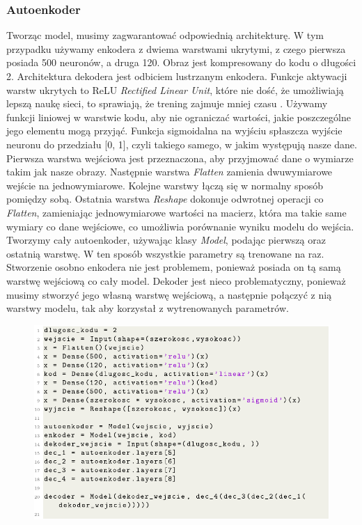 \documentclass[a4paper,12pt,oneside]{book} %
\begin{document}
\subsubsection{Autoenkoder}
Tworząc model, musimy zagwarantować odpowiednią architekturę. W tym przypadku używamy enkodera z dwiema warstwami ukrytymi, z czego pierwsza posiada 500 neuronów, a druga 120. Obraz jest kompresowany do kodu o długości 2. Architektura dekodera jest odbiciem lustrzanym enkodera. Funkcje aktywacji warstw ukrytych to ReLU \textit{Rectified Linear Unit}, które nie dość, że umożliwiają lepszą naukę sieci, to sprawiają, że trening zajmuje mniej czasu \cite{relu}. Używamy funkcji liniowej w warstwie kodu, aby nie ograniczać wartości, jakie poszczególne jego elementu mogą przyjąć. Funkcja sigmoidalna na wyjściu spłaszcza wyjście neuronu do przedziału [0, 1], czyli takiego samego, w jakim występują nasze dane.\\

Pierwsza warstwa wejściowa jest przeznaczona, aby przyjmować dane o wymiarze takim jak nasze obrazy. Następnie warstwa \textit{Flatten} zamienia dwuwymiarowe wejście na jednowymiarowe. Kolejne warstwy łączą się w normalny sposób pomiędzy sobą. Ostatnia warstwa \textit{Reshape} dokonuje odwrotnej operacji co \textit{Flatten}, zamieniając jednowymiarowe wartości na macierz, która ma takie same wymiary co dane wejściowe, co umożliwia porównanie wyniku modelu do wejścia. Tworzymy cały autoenkoder, używając klasy \textit{Model}, podając pierwszą oraz ostatnią warstwę. W ten sposób wszystkie parametry są trenowane na raz. Stworzenie osobno enkodera nie jest problemem, ponieważ posiada on tą samą warstwę wejściową co cały model. Dekoder jest nieco problematyczny, ponieważ musimy stworzyć jego własną warstwę wejściową, a następnie połączyć z nią warstwy modelu, tak aby korzystał z wytrenowanych parametrów. 
\begin{figure}[h!]
	\centering
	\includegraphics[width=\linewidth]{modelae.pdf}
\end{figure}
\end{document}
